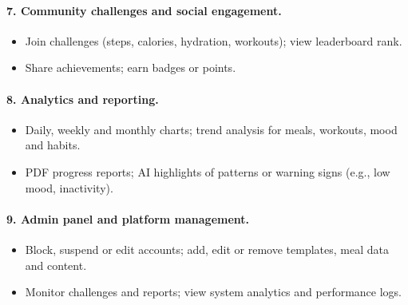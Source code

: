 \documentclass[11pt,a4paper]{report}
\begin{document}
\paragraph{7. Community challenges and social engagement.}
\begin{itemize}
 \item Join challenges (steps, calories, hydration, workouts); view leaderboard rank.
 \item Share achievements; earn badges or points.
\end{itemize}
\paragraph{8. Analytics and reporting.}
\begin{itemize}
 \item Daily, weekly and monthly charts; trend analysis for meals, workouts, mood and habits.
 \item PDF progress reports; AI highlights of patterns or warning signs (e.g., low mood, inactivity).
\end{itemize}
\paragraph{9. Admin panel and platform management.}
\begin{itemize}
 \item Block, suspend or edit accounts; add, edit or remove templates, meal data and content.
 \item Monitor challenges and reports; view system analytics and performance logs.
\end{itemize}
\end{document}

